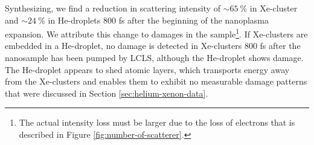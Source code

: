 %
Synthesizing, we find a reduction in scattering intensity of $\sim \SI{65}{\percent}$ in Xe-cluster and $\sim \SI{24}{\percent}$ in He-droplets 800 fs after the beginning of the nanoplasma expansion. We attribute this change to damages in the sample\footnote{The actual intensity loss must be larger due to the loss of electrons that is described in Figure \ref{fig:number-of-scatterer}.}. If Xe-clusters are embedded in a He-droplet, no damage is detected in Xe-clusters 800 fs after the nanosample has been pumped by LCLS, although the He-droplet shows damage. The He-droplet appears to shed atomic layers, which transports energy away from the Xe-clusters and enables them to exhibit no measurable damage patterns that were discussed in Section \ref{sec:helium-xenon-data}.
%
%
%
%
%
%
%
%
%
%
%
%
%
%
%
